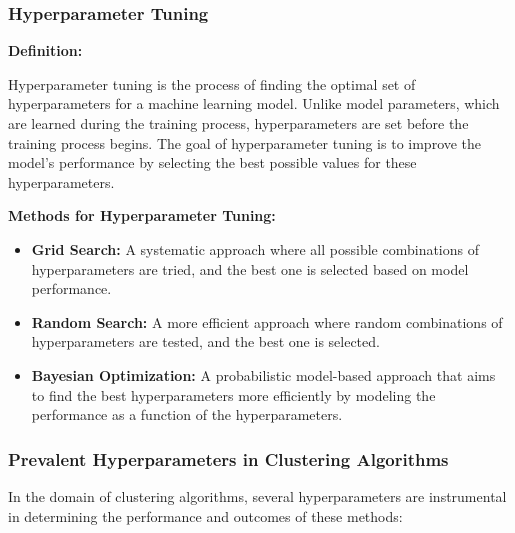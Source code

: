 \documentclass{exam}
\begin{document}
\subsubsection{Hyperparameter Tuning}

\textbf{Definition:}

Hyperparameter tuning is the process of finding the optimal set of hyperparameters for a machine learning model. Unlike model parameters, which are learned during the training process, hyperparameters are set before the training process begins. The goal of hyperparameter tuning is to improve the model's performance by selecting the best possible values for these hyperparameters.

\textbf{Methods for Hyperparameter Tuning:}
\begin{itemize}
    \item \textbf{Grid Search:} A systematic approach where all possible combinations of hyperparameters are tried, and the best one is selected based on model performance.
    \item \textbf{Random Search:} A more efficient approach where random combinations of hyperparameters are tested, and the best one is selected.
    \item \textbf{Bayesian Optimization:} A probabilistic model-based approach that aims to find the best hyperparameters more efficiently by modeling the performance as a function of the hyperparameters.
\end{itemize}

\subsubsection{Prevalent Hyperparameters in Clustering Algorithms}

In the domain of clustering algorithms, several hyperparameters are instrumental in determining the performance and outcomes of these methods:
\end{document}

